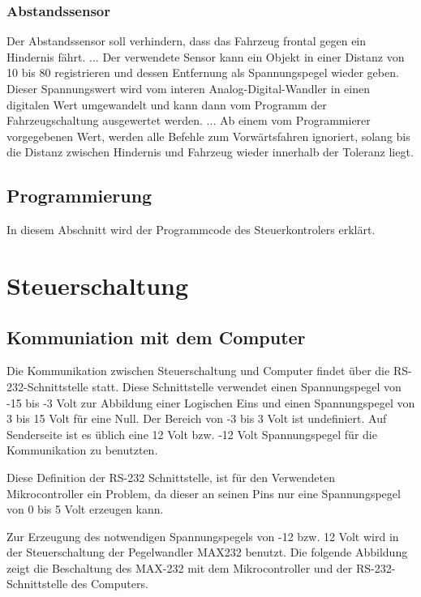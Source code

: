 \documentclass{scrartcl}
\begin{document}
		\subsubsection{Abstandssensor} %
			Der Abstandssensor soll verhindern, dass das Fahrzeug frontal gegen ein Hindernis fährt.
			...%
			Der verwendete Sensor kann ein Objekt in einer Distanz von 10  bis 80  registrieren
			und dessen Entfernung als Spannungspegel wieder geben. Dieser Spannungswert wird vom
			interen Analog-Digital-Wandler in einen digitalen Wert umgewandelt und kann dann vom
			Programm der Fahrzeugschaltung ausgewertet werden.
			...
			Ab einem vom Programmierer vorgegebenen Wert, werden alle Befehle zum Vorwärtsfahren
			ignoriert, solang bis die Distanz zwischen Hindernis und Fahrzeug wieder innerhalb
			der Toleranz liegt.
	
	\subsection{Programmierung} %
		In diesem Abschnitt wird der Programmcode des Steuerkontrolers erklärt.

\newpage

\section{Steuerschaltung}

	\subsection{Kommuniation mit dem Computer} %
		Die Kommunikation zwischen Steuerschaltung und Computer findet über die RS-232-Schnittstelle statt.
		Diese Schnittstelle verwendet einen Spannungspegel von -15 bis -3 Volt zur Abbildung einer Logischen Eins 
		und einen Spannungspegel von 3 bis 15 Volt für eine Null.
		Der Bereich von -3 bis 3 Volt ist undefiniert.
		Auf Senderseite ist es üblich eine 12 Volt bzw. -12 Volt Spannungspegel für die Kommunikation zu benutzten.

		Diese Definition der RS-232 Schnittstelle, ist für den Verwendeten Mikrocontroller ein Problem,
		da dieser an seinen Pins nur eine Spannungspegel von 0 bis 5 Volt erzeugen kann.

		Zur Erzeugung des notwendigen Spannungspegels von -12 bzw. 12 Volt wird in der Steuerschaltung der Pegelwandler MAX232 benutzt.
		Die folgende Abbildung zeigt die Beschaltung des MAX-232 mit dem Mikrocontroller und der RS-232-Schnittstelle des Computers.
\end{document}
